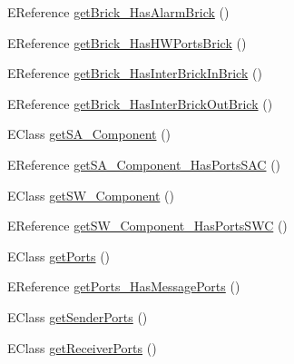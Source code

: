 \begin{DoxyCompactItemize}
\item 
E\-Reference \hyperlink{classshootingmachineemfmodel_1_1impl_1_1_shootingmachineemfmodel_package_impl_a67d402c42e0b2d2f1995496ad762daea}{get\-Brick\-\_\-\-Has\-Alarm\-Brick} ()
\item 
E\-Reference \hyperlink{classshootingmachineemfmodel_1_1impl_1_1_shootingmachineemfmodel_package_impl_aeeaf785ee182d53d711cb4e062e712f1}{get\-Brick\-\_\-\-Has\-H\-W\-Ports\-Brick} ()
\item 
E\-Reference \hyperlink{classshootingmachineemfmodel_1_1impl_1_1_shootingmachineemfmodel_package_impl_a9cce3bd6ec082b7b08f0d6e736f394d4}{get\-Brick\-\_\-\-Has\-Inter\-Brick\-In\-Brick} ()
\item 
E\-Reference \hyperlink{classshootingmachineemfmodel_1_1impl_1_1_shootingmachineemfmodel_package_impl_aa3a3f028f0015d6b304a3f32b3920ce1}{get\-Brick\-\_\-\-Has\-Inter\-Brick\-Out\-Brick} ()
\item 
E\-Class \hyperlink{classshootingmachineemfmodel_1_1impl_1_1_shootingmachineemfmodel_package_impl_a8ca2d4f6946a882d7676eef21e132f62}{get\-S\-A\-\_\-\-Component} ()
\item 
E\-Reference \hyperlink{classshootingmachineemfmodel_1_1impl_1_1_shootingmachineemfmodel_package_impl_ae9c82c024aa373a17f5267a574b5f6c7}{get\-S\-A\-\_\-\-Component\-\_\-\-Has\-Ports\-S\-A\-C} ()
\item 
E\-Class \hyperlink{classshootingmachineemfmodel_1_1impl_1_1_shootingmachineemfmodel_package_impl_aea506b8692fe0c081070fce6bd9295f7}{get\-S\-W\-\_\-\-Component} ()
\item 
E\-Reference \hyperlink{classshootingmachineemfmodel_1_1impl_1_1_shootingmachineemfmodel_package_impl_a708d63c27580eb46e3ac01c6cedeeed9}{get\-S\-W\-\_\-\-Component\-\_\-\-Has\-Ports\-S\-W\-C} ()
\item 
E\-Class \hyperlink{classshootingmachineemfmodel_1_1impl_1_1_shootingmachineemfmodel_package_impl_ab434e3a5bfcdf490bed77881dae0841e}{get\-Ports} ()
\item 
E\-Reference \hyperlink{classshootingmachineemfmodel_1_1impl_1_1_shootingmachineemfmodel_package_impl_a07abc10f6558a2e3fd0b2949287b513f}{get\-Ports\-\_\-\-Has\-Message\-Ports} ()
\item 
E\-Class \hyperlink{classshootingmachineemfmodel_1_1impl_1_1_shootingmachineemfmodel_package_impl_a65cf0393c49f9556064a7d50a35b56a1}{get\-Sender\-Ports} ()
\item 
E\-Class \hyperlink{classshootingmachineemfmodel_1_1impl_1_1_shootingmachineemfmodel_package_impl_a821826b4a77ddfe1d4366780aeef3b9c}{get\-Receiver\-Ports} ()

\end{DoxyCompactItemize}
